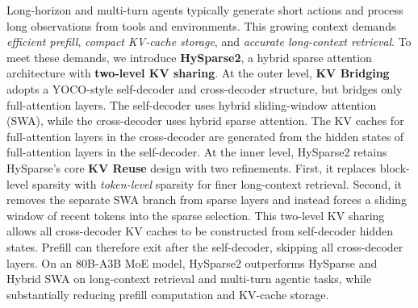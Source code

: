 Long-horizon and multi-turn agents typically generate short actions and process long observations from tools and environments. 
This growing context demands \textit{efficient prefill}, \textit{compact KV-cache storage}, and \textit{accurate long-context retrieval}.
To meet these demands, we introduce \textbf{HySparse2}, a hybrid sparse attention architecture with \textbf{two-level KV sharing}.
At the outer level, \textbf{KV Bridging} adopts a YOCO-style self-decoder and cross-decoder structure, but bridges only full-attention layers.
The self-decoder uses hybrid sliding-window attention (SWA), while the cross-decoder uses hybrid sparse attention.
The KV caches for full-attention layers in the cross-decoder are generated from the hidden states of full-attention layers in the self-decoder.
At the inner level, HySparse2 retains HySparse's core \textbf{KV Reuse} design with two refinements.
First, it replaces block-level sparsity with \textit{token-level} sparsity for finer long-context retrieval.
Second, it removes the separate SWA branch from sparse layers and instead forces a sliding window of recent tokens into the sparse selection.
This two-level KV sharing allows all cross-decoder KV caches to be constructed from self-decoder hidden states.
Prefill can therefore exit after the self-decoder, skipping all cross-decoder layers.
On an 80B-A3B MoE model, HySparse2 outperforms HySparse and Hybrid SWA on long-context retrieval and multi-turn agentic tasks, while substantially reducing prefill computation and KV-cache storage.
